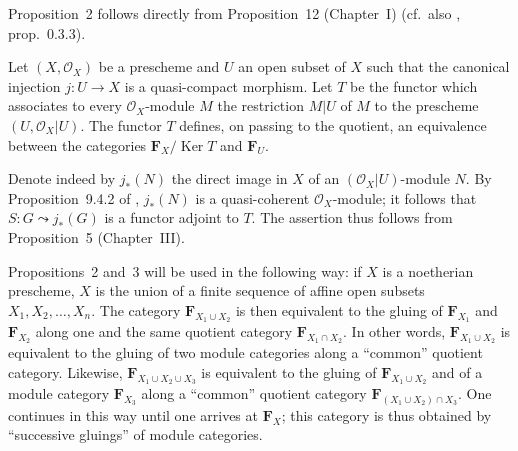 Proposition~2 follows directly from Proposition~12 (Chapter~I) (cf.\
also \textup{\cite{grothendieck-dieudonne}}, prop.~0.3.3).

\begin{proposition}
Let $(X, \mathcal{O}_X)$ be a prescheme and $U$ an open subset of $X$
such that the canonical injection $j : U \to X$ is a quasi-compact
morphism. Let $T$ be the functor which associates to every
$\mathcal{O}_X$-module $M$ the restriction $M|U$ of $M$ to the
prescheme $(U, \mathcal{O}_X|U)$. The functor $T$ defines, on passing to
the quotient, an equivalence between the categories
$\mathbf{F}_X/\operatorname{Ker} T$ and $\mathbf{F}_U$.
\end{proposition}

Denote indeed by $j_*(N)$ the direct image in $X$ of an
$(\mathcal{O}_X|U)$-module $N$. By Proposition~9.4.2 of
\textup{\cite{grothendieck-dieudonne}}, $j_*(N)$ is a quasi-coherent
$\mathcal{O}_X$-module; it follows that $S : G \leadsto j_*(G)$ is a
functor adjoint to $T$. The assertion thus follows from Proposition~5
(Chapter~III).

Propositions~2 and~3 will be used in the following way: if $X$ is a
noetherian prescheme, $X$ is the union of a finite sequence of affine
open subsets $X_1, X_2, \ldots, X_n$. The category
$\mathbf{F}_{X_1 \cup X_2}$ is then equivalent to the gluing of
$\mathbf{F}_{X_1}$ and $\mathbf{F}_{X_2}$ along one and the same
quotient category $\mathbf{F}_{X_1 \cap X_2}$. In other words,
$\mathbf{F}_{X_1 \cup X_2}$ is equivalent to the gluing of two module
categories along a ``common'' quotient category. Likewise,
$\mathbf{F}_{X_1 \cup X_2 \cup X_3}$ is equivalent to the gluing of
$\mathbf{F}_{X_1 \cup X_2}$ and of a module category
$\mathbf{F}_{X_3}$ along a ``common'' quotient category
$\mathbf{F}_{(X_1 \cup X_2) \cap X_3}$. One continues in this way until
one arrives at $\mathbf{F}_X$; this category is thus obtained by
``successive gluings'' of module categories.
